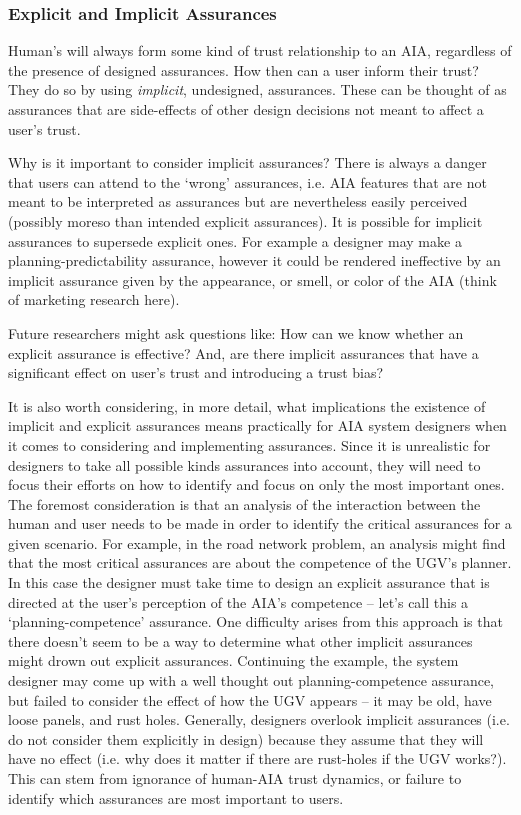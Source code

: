 \subsubsection{Explicit and Implicit Assurances}
Human's will always form some kind of trust relationship to an AIA, regardless of the presence of designed assurances. How then can a user inform their trust? They do so by using \emph{implicit}, undesigned, assurances. These can be thought of as assurances that are side-effects of other design decisions not meant to affect a user's trust.

Why is it important to consider implicit assurances? There is always a danger that users can attend to the `wrong' assurances, i.e. AIA features that are not meant to be interpreted as assurances but are nevertheless easily perceived (possibly moreso than intended explicit assurances). It is possible for implicit assurances to supersede explicit ones. For example a designer may make a planning-predictability assurance, however it could be rendered ineffective by an implicit assurance given by the appearance, or smell, or color of the AIA (think of marketing research here).

Future researchers might ask questions like: How can we know whether an explicit assurance is effective? And, are there implicit assurances that have a significant effect on user's trust and introducing a trust bias?

It is also worth considering, in more detail, what implications the existence of implicit and explicit assurances means practically for AIA system designers when it comes to considering and implementing assurances. 
Since it is unrealistic for designers to take all possible kinds assurances into account, they will need to focus their efforts on how to identify and focus on only the most important ones. 
The foremost consideration is that an analysis of the interaction between the human and user needs to be made in order to identify the critical assurances for a given scenario. 
For example, in the road network problem, an analysis might find that the most critical assurances are about the competence of the UGV's planner. 
In this case the designer must take time to design an explicit assurance that is directed at the user's perception of the AIA's competence -- let's call this a `planning-competence' assurance. 
One difficulty arises from this approach is that there doesn't seem to be a way to determine what other implicit assurances might drown out explicit assurances. 
Continuing the example, the system designer may come up with a well thought out planning-competence assurance, but failed to consider the effect of how the UGV appears -- it may be old, have loose panels, and rust holes. Generally, designers overlook implicit assurances (i.e. do not consider them explicitly in design) because they assume that they will have no effect (i.e. why does it matter if there are rust-holes if the UGV works?). This can stem from ignorance of human-AIA trust dynamics, or failure to identify which assurances are most important to users.

